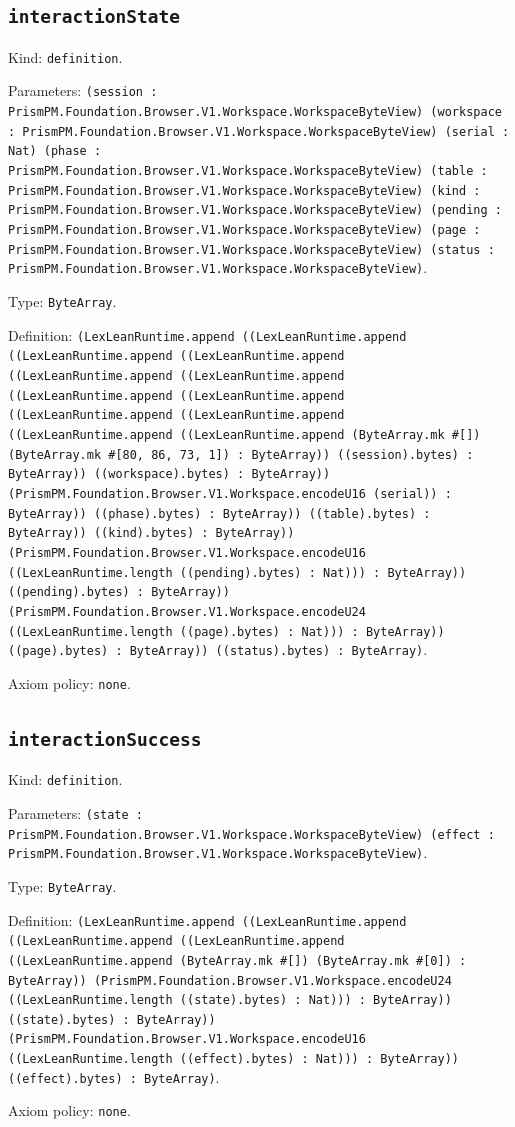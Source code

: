 \documentclass[11pt]{article}
\begin{document}
\subsection*{\texttt{interactionState}}
\noindent Kind: \texttt{definition}.\par
\noindent Parameters: \texttt{(session : PrismPM.Foundation.Browser.V1.Workspace.WorkspaceByteView) (workspace : PrismPM.Foundation.Browser.V1.Workspace.WorkspaceByteView) (serial : Nat) (phase : PrismPM.Foundation.Browser.V1.Workspace.WorkspaceByteView) (table : PrismPM.Foundation.Browser.V1.Workspace.WorkspaceByteView) (kind : PrismPM.Foundation.Browser.V1.Workspace.WorkspaceByteView) (pending : PrismPM.Foundation.Browser.V1.Workspace.WorkspaceByteView) (page : PrismPM.Foundation.Browser.V1.Workspace.WorkspaceByteView) (status : PrismPM.Foundation.Browser.V1.Workspace.WorkspaceByteView)}.\par
\noindent Type: \texttt{ByteArray}.\par
\noindent Definition: \texttt{(LexLeanRuntime.append ((LexLeanRuntime.append ((LexLeanRuntime.append ((LexLeanRuntime.append ((LexLeanRuntime.append ((LexLeanRuntime.append ((LexLeanRuntime.append ((LexLeanRuntime.append ((LexLeanRuntime.append ((LexLeanRuntime.append ((LexLeanRuntime.append ((LexLeanRuntime.append (ByteArray.mk \#[]) (ByteArray.mk \#[80, 86, 73, 1]) : ByteArray)) ((session).bytes) : ByteArray)) ((workspace).bytes) : ByteArray)) (PrismPM.Foundation.Browser.V1.Workspace.encodeU16 (serial)) : ByteArray)) ((phase).bytes) : ByteArray)) ((table).bytes) : ByteArray)) ((kind).bytes) : ByteArray)) (PrismPM.Foundation.Browser.V1.Workspace.encodeU16 ((LexLeanRuntime.length ((pending).bytes) : Nat))) : ByteArray)) ((pending).bytes) : ByteArray)) (PrismPM.Foundation.Browser.V1.Workspace.encodeU24 ((LexLeanRuntime.length ((page).bytes) : Nat))) : ByteArray)) ((page).bytes) : ByteArray)) ((status).bytes) : ByteArray)}.\par
\noindent Axiom policy: \texttt{none}.\par
\subsection*{\texttt{interactionSuccess}}
\noindent Kind: \texttt{definition}.\par
\noindent Parameters: \texttt{(state : PrismPM.Foundation.Browser.V1.Workspace.WorkspaceByteView) (effect : PrismPM.Foundation.Browser.V1.Workspace.WorkspaceByteView)}.\par
\noindent Type: \texttt{ByteArray}.\par
\noindent Definition: \texttt{(LexLeanRuntime.append ((LexLeanRuntime.append ((LexLeanRuntime.append ((LexLeanRuntime.append ((LexLeanRuntime.append (ByteArray.mk \#[]) (ByteArray.mk \#[0]) : ByteArray)) (PrismPM.Foundation.Browser.V1.Workspace.encodeU24 ((LexLeanRuntime.length ((state).bytes) : Nat))) : ByteArray)) ((state).bytes) : ByteArray)) (PrismPM.Foundation.Browser.V1.Workspace.encodeU16 ((LexLeanRuntime.length ((effect).bytes) : Nat))) : ByteArray)) ((effect).bytes) : ByteArray)}.\par
\noindent Axiom policy: \texttt{none}.\par
\end{document}
